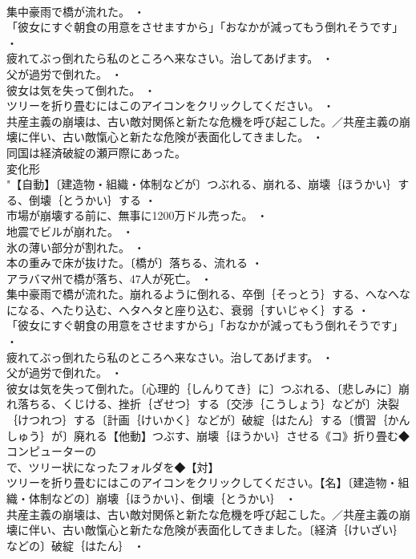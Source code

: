 \documentclass[8pt]{extreport}
\begin{document}
\begin{CJK}{UTF8}{min}
\\	集中豪雨で橋が流れた。 ・
\\	「彼女にすぐ朝食の用意をさせますから」「おなかが減ってもう倒れそうです」 ・
\\	疲れてぶっ倒れたら私のところへ来なさい。治してあげます。 ・
\\	父が過労で倒れた。 ・
\\	彼女は気を失って倒れた。 ・
\\	ツリーを折り畳むにはこのアイコンをクリックしてください。 ・
\\	共産主義の崩壊は、古い敵対関係と新たな危機を呼び起こした。／共産主義の崩壊に伴い、古い敵愾心と新たな危険が表面化してきました。 ・
\\	同国は経済破綻の瀬戸際にあった。
\\	変化形 
\\	"【自動】〔建造物・組織・体制などが〕つぶれる、崩れる、崩壊｛ほうかい｝する、倒壊｛とうかい｝する ・
\\	市場が崩壊する前に、無事に1200万ドル売った。 ・
\\	地震でビルが崩れた。 ・
\\	氷の薄い部分が割れた。 ・
\\	本の重みで床が抜けた。〔橋が〕落ちる、流れる ・
\\	アラバマ州で橋が落ち、47人が死亡。 ・
\\	集中豪雨で橋が流れた。崩れるように倒れる、卒倒｛そっとう｝する、へなへなになる、へたり込む、ヘタヘタと座り込む、衰弱｛すいじゃく｝する ・
\\	「彼女にすぐ朝食の用意をさせますから」「おなかが減ってもう倒れそうです」 ・
\\	疲れてぶっ倒れたら私のところへ来なさい。治してあげます。 ・
\\	父が過労で倒れた。 ・
\\	彼女は気を失って倒れた。〔心理的｛しんりてき｝に〕つぶれる、〔悲しみに〕崩れ落ちる、くじける、挫折｛ざせつ｝する〔交渉｛こうしょう｝などが〕決裂｛けつれつ｝する〔計画｛けいかく｝などが〕破綻｛はたん｝する〔慣習｛かんしゅう｝が〕廃れる【他動】つぶす、崩壊｛ほうかい｝させる《コ》折り畳む◆コンピューターの
\\	で、ツリー状になったフォルダを◆【対】
\\	ツリーを折り畳むにはこのアイコンをクリックしてください。【名】〔建造物・組織・体制などの〕崩壊｛ほうかい｝、倒壊｛とうかい｝ ・
\\	共産主義の崩壊は、古い敵対関係と新たな危機を呼び起こした。／共産主義の崩壊に伴い、古い敵愾心と新たな危険が表面化してきました。〔経済｛けいざい｝などの〕破綻｛はたん｝ ・

\end{CJK}
\end{document}
